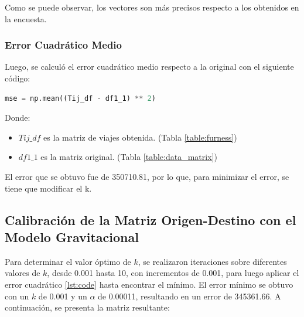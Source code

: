 \documentclass[letterpaper,12pt]{article}
\begin{document}
Como se puede observar, los vectores son más precisos respecto a los obtenidos en la encuesta.


\subsubsection{Error Cuadrático Medio}
Luego, se calculó el error cuadrático medio respecto a la original con el siguiente código:


\begin{lstlisting}[language=Python, label={lst:code}]
    mse = np.mean((Tij_df - df1_1) ** 2)
\end{lstlisting}

Donde:
\begin{itemize}
    \item $Tij\_df$ es la matriz de viajes obtenida. (Tabla \ref{table:furness})
    \item $df1\_1$ es la matriz original. (Tabla \ref{table:data_matrix})
\end{itemize}

El error que se obtuvo fue de 350710.81, por lo que, para minimizar el error, se tiene que modificar el k.

\subsection{Calibración de la Matriz Origen-Destino con el Modelo Gravitacional}
Para determinar el valor óptimo de \( k \), se realizaron iteraciones sobre diferentes valores de \( k \), desde 0.001 hasta 10, con incrementos de 0.001, para luego aplicar el error cuadrático \ref{lst:code} hasta encontrar el mínimo. El error mínimo se obtuvo con un \( k \) de 0.001 y un \( \alpha \) de 0.00011, resultando en un error de 345361.66. A continuación, se presenta la matriz resultante:
\end{document}
